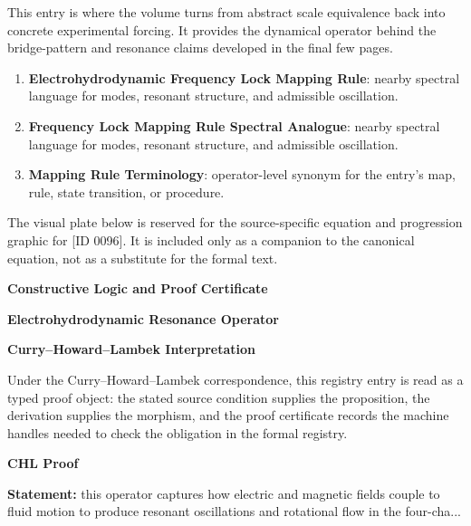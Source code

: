 This entry is where the volume turns from abstract scale equivalence back into concrete experimental forcing. It provides the dynamical operator behind the bridge-pattern and resonance claims developed in the final few pages.
\endgroup

\begingroup\footnotesize\sloppy
\begin{enumerate}[leftmargin=1.35em,itemsep=1pt,topsep=1pt,parsep=0pt]
\item \textbf{Electrohydrodynamic Frequency Lock Mapping Rule}: nearby spectral language for modes, resonant structure, and admissible oscillation.
\item \textbf{Frequency Lock Mapping Rule Spectral Analogue}: nearby spectral language for modes, resonant structure, and admissible oscillation.
\item \textbf{Mapping Rule Terminology}: operator-level synonym for the entry's map, rule, state transition, or procedure.
\end{enumerate}
\endgroup

\begingroup\footnotesize\sloppy
The visual plate below is reserved for the source-specific equation and progression graphic for [ID 0096]. It is included only as a companion to the canonical equation, not as a substitute for the formal text.
\par\endgroup
\ifTZPDarkEdition
{}
\fi

\clearpage
\begingroup\tzpsupportsetup
\noindent\textbf{\fontsize{10.8pt}{12.8pt}\selectfont [ID 0096] Constructive Logic and Proof Certificate}\par
\noindent\textbf{\fontsize{10pt}{12pt}\selectfont Electrohydrodynamic Resonance Operator}\par
\vspace{0.45em}
\begingroup
\footnotesize
\setlength{\parskip}{0.22em}
\setlength{\parindent}{0pt}
\noindent\textbf{Curry--Howard--Lambek Interpretation}\par
Under the Curry--Howard--Lambek correspondence, this registry entry is read as a typed proof
object: the stated source condition supplies the proposition, the derivation supplies the
morphism, and the proof certificate records the machine handles needed to check the obligation
in the formal registry.

\vspace{0.45em}
\noindent\textbf{CHL Proof}\par
\textbf{Statement:} this operator captures how electric and magnetic fields couple to fluid motion to
produce resonant oscillations and rotational flow in the four-cha...

